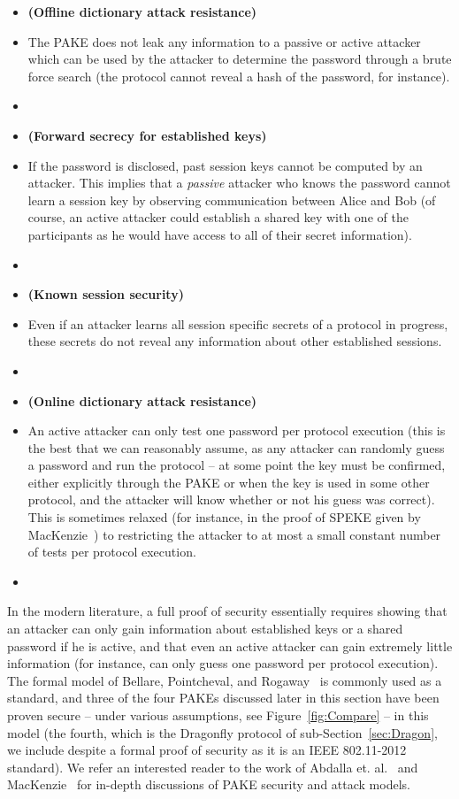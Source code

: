 \documentclass{amsart}
\theoremstyle{remark}
\begin{document}
\begin{itemize}
 \item[] \textbf{(Offline dictionary attack resistance)}
 \item[] The PAKE does not leak any information to a passive or active attacker which can be 
 used by the attacker to determine the password through a brute force search (the protocol 
 cannot reveal a hash of the password, for instance).
 \item[]
 \item[] \textbf{(Forward secrecy for established keys)}
 \item[] If the password is disclosed, past session keys cannot be computed by an attacker.  
 This implies that a \emph{passive} attacker who knows the password cannot learn a session 
 key by observing communication between Alice and Bob (of course, an active attacker could 
 establish a shared key with one of the participants as he would have access to all of their 
 secret information).
 \item[]
 \item[] \textbf{(Known session security)}
 \item[] Even if an attacker learns all session specific secrets of a protocol in progress, these secrets do not reveal 
 any information about other established sessions.
  \item[]
 \item[] \textbf{(Online dictionary attack resistance)}
 \item[] An active attacker can only test one password per protocol execution (this is the 
 best that we can reasonably assume, as any attacker can randomly guess a password and 
 run the protocol -- at some point the key must be confirmed, either explicitly through the 
 PAKE or when the key is used in some other protocol, and the attacker will know whether or
 not his guess was correct).  This is sometimes relaxed (for instance, in the proof of SPEKE given
 by MacKenzie~\cite{Mac01}) to restricting the attacker to at most a small constant number of tests
 per protocol execution.
\item[]
\end{itemize}

 In the modern literature, a full proof of security essentially requires showing that an attacker
 can only gain information about established keys or a shared password if he is active, and that even an active
 attacker can gain extremely little information (for instance, can only guess one password per protocol execution).
 The formal model of Bellare, Pointcheval, and Rogaway~\cite{BePoRo00} is commonly used as a standard, and three of the 
 four PAKEs discussed later in this section have been proven secure -- under various assumptions, see Figure~\ref{fig:Compare} -- in
 this model (the fourth, which is the Dragonfly protocol of sub-Section~\ref{sec:Dragon}, we include despite a formal 
 proof of security as it is an IEEE 802.11-2012 standard).  We refer an interested reader to the work of 
 Abdalla et. al.~\cite{AbdBenMac15} and MacKenzie~\cite{Mac02} for in-depth discussions of PAKE security and attack models.
\end{document}
